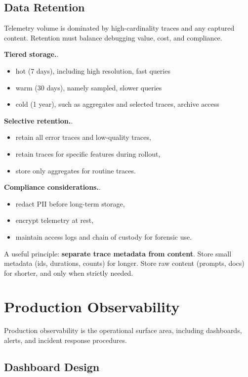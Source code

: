 \subsection{Data Retention}

Telemetry volume is dominated by high-cardinality traces and any captured content. Retention must balance debugging value, cost, and compliance.

\textbf{Tiered storage.}.
\begin{itemize}
\item hot (7 days), including high resolution, fast queries
\item warm (30 days), namely sampled, slower queries
\item cold (1 year), such as aggregates and selected traces, archive access
\end{itemize}

\textbf{Selective retention.}.
\begin{itemize}
\item retain all error traces and low-quality traces,
\item retain traces for specific features during rollout,
\item store only aggregates for routine traces.
\end{itemize}

\textbf{Compliance considerations.}.
\begin{itemize}
\item redact PII before long-term storage,
\item encrypt telemetry at rest,
\item maintain access logs and chain of custody for forensic use.
\end{itemize}

A useful principle: \textbf{separate trace metadata from content}. Store small metadata (ids, durations, counts) for longer. Store raw content (prompts, docs) for shorter, and only when strictly needed.

\section{Production Observability}

Production observability is the operational surface area, including dashboards, alerts, and incident response procedures.

\subsection{Dashboard Design}

